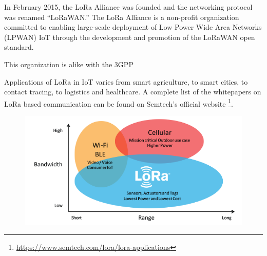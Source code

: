 			In February 2015, the LoRa Alliance was founded and the networking protocol was renamed “LoRaWAN.”
			The LoRa Alliance is a non-profit organization committed to enabling large-scale deployment of Low Power Wide Area Networks (LPWAN) IoT through the development and promotion of the LoRaWAN open standard.
			
			This organization is alike with the 3GPP 
			
			Applications of LoRa in IoT varies from smart agriculture, to smart cities, to contact tracing, to logistics and healthcare.
			A complete list of the whitepapers on LoRa based communication can be found on Semtech's official website \footnote{\url{https://www.semtech.com/lora/lora-applications}}.
			
			
			\begin{figure}[H]
				\centering
				\includegraphics[width=\textwidth]{resources/img/LoRa_Why_Range}
				\caption{}
			\end{figure}
	
	
